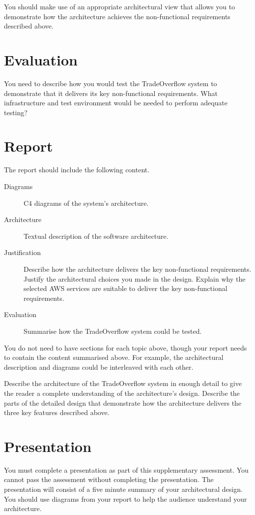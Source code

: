 \documentclass{csse4400}
\begin{document}
You should make use of an appropriate architectural view that allows you to demonstrate how the architecture achieves the non-functional requirements described above.


\section{Evaluation}
You need to describe how you would test the TradeOverflow system to demonstrate that it delivers its key non-functional requirements.
What infrastructure and test environment would be needed to perform adequate testing?


\section{Report}
The report should include the following content.

\begin{description}
    \item[Diagrams] C4 diagrams of the system's architecture.
    \item[Architecture] Textual description of the software architecture.
    \item[Justification] Describe how the architecture delivers the key non-functional requirements. Justify the architectural choices you made in the design. Explain why the selected AWS services are suitable to deliver the key non-functional requirements.
    \item[Evaluation] Summarise how the TradeOverflow system could be tested.
\end{description}

You do not need to have sections for each topic above, though your report needs to contain the content summarised above.
For example, the architectural description and diagrams could be interleaved with each other.

Describe the architecture of the TradeOverflow system in enough detail
to give the reader a complete understanding of the architecture's design.
Describe the parts of the detailed design that demonstrate how the architecture delivers the three key features described above.


\section{Presentation}
You must complete a presentation as part of this supplementary assessment.
You cannot pass the assessment without completing the presentation.
The presentation will consist of a five minute summary of your architectural design.
You should use diagrams from your report to help the audience understand your architecture.
\end{document}
